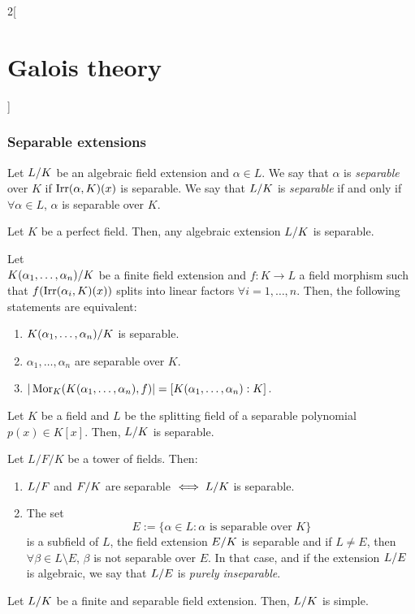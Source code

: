 \documentclass[../../../main.tex]{subfiles}
\begin{document}
\begin{multicols}{2}[\section{Galois theory}]
  \subsubsection{Separable extensions}
  \begin{definition}
    Let $\quot{L}{K}$ be an algebraic field extension and $\alpha\in L$. We say that $\alpha$ is \emph{separable} over $K$ if $\operatorname{Irr}(\alpha,K)(x)$ is separable. We say that $\quot{L}{K}$ is \emph{separable} if and only if $\forall \alpha\in L$, $\alpha$ is separable over $K$.
  \end{definition}
  \begin{corollary}
    Let $K$ be a perfect field. Then, any algebraic extension $\quot{L}{K}$ is separable.
  \end{corollary}
  \begin{theorem}
    Let\\ $\quot{K(\alpha_1,\ldots,\alpha_n)}{K}$ be a finite field extension and $f:K\rightarrow L$ a field morphism such that $f(\operatorname{Irr}(\alpha_i,K)(x))$ splits into linear factors $\forall i=1,\ldots,n$. Then, the following statements are equivalent:
    \begin{enumerate}
      \item $\quot{K(\alpha_1,\ldots,\alpha_n)}{K}$ is separable.
      \item $\alpha_1,\ldots,\alpha_n$ are separable over $K$.
      \item $|\operatorname{Mor}_K(K(\alpha_1,\ldots,\alpha_n),f)|=[K(\alpha_1,\ldots,\alpha_n):K]$.
    \end{enumerate}
  \end{theorem}
  \begin{corollary}
    Let $K$ be a field and $L$ be the splitting field of a separable polynomial $p(x)\in K[x]$. Then, $\quot{L}{K}$ is separable.
  \end{corollary}
  \begin{prop}
    Let $L/F/K$ be a tower of fields. Then:
    \begin{enumerate}
      \item $\quot{L}{F}$ and $\quot{F}{K}$ are separable $\iff\quot{L}{K}$ is separable.
      \item The set $$E:=\{\alpha\in L:\alpha\text{ is separable over }K\}$$ is a subfield of $L$, the field extension $\quot{E}{K}$ is separable and if $L\ne E$, then $\forall\beta\in L\setminus E$, $\beta$ is not separable over $E$. In that case, and if the extension $\quot{L}{E}$ is algebraic, we say that $\quot{L}{E}$ is \emph{purely inseparable}.
    \end{enumerate}
  \end{prop}
  \begin{theorem}
    Let $\quot{L}{K}$ be a finite and separable field extension. Then, $\quot{L}{K}$ is simple.
  \end{theorem}

\end{multicols}
\end{document}
